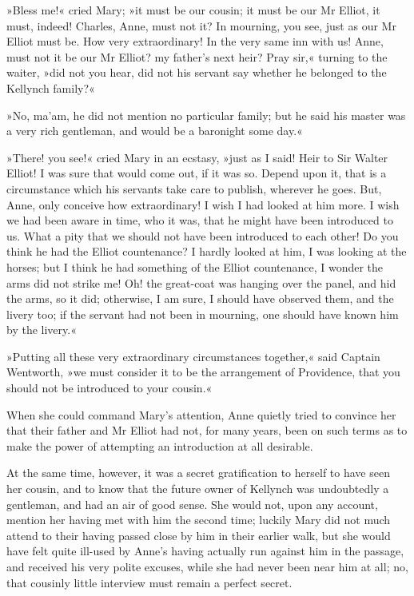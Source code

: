 »Bless me!« cried Mary; »it must be our cousin; it must be our Mr Elliot, it must, indeed! Charles, Anne, must not it? In mourning, you see, just as our Mr Elliot must be. How very extraordinary! In the very same inn with us! Anne, must not it be our Mr Elliot? my father's next heir? Pray sir,« turning to the waiter, »did not you hear, did not his servant say whether he belonged to the Kellynch family?«

»No, ma'am, he did not mention no particular family; but he said his master was a very rich gentleman, and would be a baronight some day.«

»There! you see!« cried Mary in an ecstasy, »just as I said! Heir to Sir Walter Elliot! I was sure that would come out, if it was so. Depend upon it, that is a circumstance which his servants take care to publish, wherever he goes. But, Anne, only conceive how extraordinary! I wish I had looked at him more. I wish we had been aware in time, who it was, that he might have been introduced to us. What a pity that we should not have been introduced to each other! Do you think he had the Elliot countenance? I hardly looked at him, I was looking at the horses; but I think he had something of the Elliot countenance, I wonder the arms did not strike me! Oh! the great-coat was hanging over the panel, and hid the arms, so it did; otherwise, I am sure, I should have observed them, and the livery too; if the servant had not been in mourning, one should have known him by the livery.«

»Putting all these very extraordinary circumstances together,« said Captain Wentworth, »we must consider it to be the arrangement of Providence, that you should not be introduced to your cousin.«

When she could command Mary's attention, Anne quietly tried to convince her that their father and Mr Elliot had not, for many years, been on such terms as to make the power of attempting an introduction at all desirable.

At the same time, however, it was a secret gratification to herself to have seen her cousin, and to know that the future owner of Kellynch was undoubtedly a gentleman, and had an air of good sense. She would not, upon any account, mention her having met with him the second time; luckily Mary did not much attend to their having passed close by him in their earlier walk, but she would have felt quite ill-used by Anne's having actually run against him in the passage, and received his very polite excuses, while she had never been near him at all; no, that cousinly little interview must remain a perfect secret.

